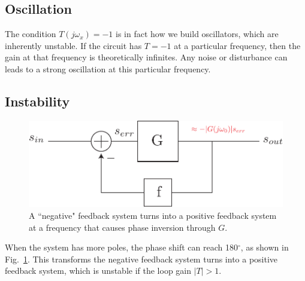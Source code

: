 \subsection{Oscillation}
The condition $T(j\omega_x) = -1$ is in fact how we build oscillators, which are inherently unstable. If the circuit has $T = -1$ at a particular frequency, then the gain at that frequency is theoretically infinites.  Any noise or disturbance can leads to a strong oscillation at this particular frequency.
\subsection{Instability}
\begin{figure}[tb]
\begin{center}
\includegraphics[scale=.7]{fbblock_phase}
\end{center}
\caption{A ``negative" feedback system turns into a positive feedback system at a frequency that causes phase inversion through $G$.}
\label{fig:fbblock_phase}
\end{figure}

When the system has more poles, the phase shift can reach 180$^\circ$, as shown in Fig.~\ref{fig:fbblock_phase}. 
This transforms the negative feedback system turns into a positive feedback system, which is unstable if the loop gain $|T|>1$.  

